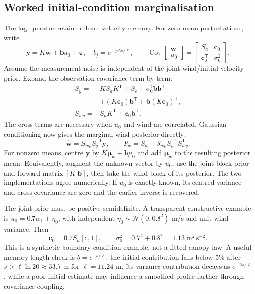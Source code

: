 \documentclass[11pt,a4paper]{article}
\numberwithin{equation}{section}
\newcommand{\Cov}{\operatorname{Cov}}
\begin{document}
\subsection{Worked initial-condition marginalisation}
The lag operator retains release-velocity memory. For zero-mean perturbations, write
\begin{equation}
 \mathbf y=K\mathbf w+\mathbf b u_0+\boldsymbol\varepsilon,
 \quad b_j=e^{-j\Delta s/\ell},\qquad
 \Cov\begin{bmatrix}\mathbf w\\u_0\end{bmatrix}
 =\begin{bmatrix}S_a&\mathbf c_0\\\mathbf c_0^{\mathsf T}&\sigma_0^2\end{bmatrix}.
\end{equation}
Assume the measurement noise is independent of the joint wind/initial-velocity prior. Expand the observation covariance term by term:
\begin{align}
 S_y={}&KS_aK^{\mathsf T}+S_\varepsilon+\sigma_0^2\mathbf b\mathbf b^{\mathsf T}\\
 &+(K\mathbf c_0)\mathbf b^{\mathsf T}+\mathbf b(K\mathbf c_0)^{\mathsf T},\\
 S_{wy}={}&S_aK^{\mathsf T}+\mathbf c_0\mathbf b^{\mathsf T}.
\end{align}
The cross terms are necessary when $u_0$ and wind are correlated. Gaussian conditioning now gives the marginal wind posterior directly:
\begin{equation}
 \boxed{\widehat{\mathbf w}=S_{wy}S_y^{-1}\mathbf y,\qquad
 P_w=S_a-S_{wy}S_y^{-1}S_{wy}^{\mathsf T}.}
\end{equation}
For nonzero means, centre $\mathbf y$ by $K\boldsymbol\mu_w+\mathbf b\mu_0$ and add $\boldsymbol\mu_w$ to the resulting posterior mean. Equivalently, augment the unknown vector by $u_0$, use the joint block prior and forward matrix $[K\;\mathbf b]$, then take the wind block of its posterior. The two implementations agree numerically. If $u_0$ is exactly known, its centred variance and cross covariance are zero and the earlier inverse is recovered.

The joint prior must be positive semidefinite. A transparent constructive example is $u_0=0.7w_1+\eta_0$, with independent $\eta_0\sim\mathcal N(0,0.8^2)$ m/s and unit wind variance. Then
\begin{equation}
 \mathbf c_0=0.7S_a[:,1],\qquad \sigma_0^2=0.7^2+0.8^2=1.13\;\mathrm{m^2\,s^{-2}}.
\end{equation}
This is a synthetic boundary-condition example, not a fitted canopy law. A useful memory-length check is $b=e^{-s/\ell}$: the initial contribution falls below 5\% after $s>\ell\ln20\approx33.7$ m for $\ell=11.24$ m. Its variance contribution decays as $e^{-2s/\ell}$, while a poor initial estimate may influence a smoothed profile farther through covariance coupling.
\end{document}
